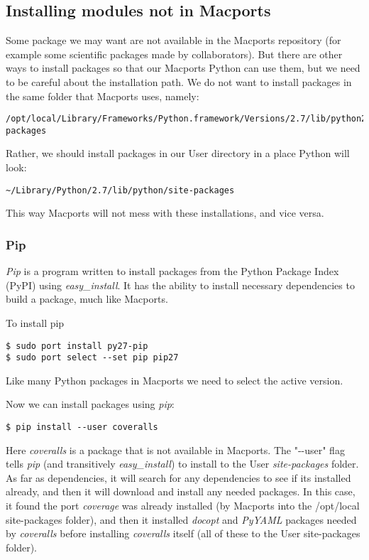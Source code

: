 \documentclass[11pt, A4paper]{article}
\begin{document}
\subsection{Installing modules not in Macports}
Some package we may want are not available in the Macports repository (for example some scientific packages made by collaborators). But there are other ways to install packages so that our Macports Python can use them, but we need to be careful about the installation path. We do not want to install packages in the same folder that Macports uses, namely:
\begin{lstlisting}[style=Bash]
/opt/local/Library/Frameworks/Python.framework/Versions/2.7/lib/python2.7/site-packages
\end{lstlisting}
Rather, we should install packages in our User directory in a place Python will look:
\begin{lstlisting}[style=Bash]
~/Library/Python/2.7/lib/python/site-packages
\end{lstlisting}
This way Macports will not mess with these installations, and vice versa. 



\subsubsection{Pip}
{\it Pip} is a program written to install packages from the Python Package Index (PyPI) using {\it easy\_install}. It has the ability to install necessary dependencies to build a package, much like Macports. 

To install pip
\begin{lstlisting}[style=Bash]
$ sudo port install py27-pip
$ sudo port select --set pip pip27
\end{lstlisting}
Like many Python packages in Macports we need to select the active version.

Now we can install packages using {\it pip}:
\begin{lstlisting}[style=Bash]
$ pip install --user coveralls
\end{lstlisting}
Here {\it coveralls} is a package that is not available in Macports. The "-{}-user" flag tells {\it pip} (and transitively {\it easy\_install}) to install to the User {\it site-packages} folder. As far as dependencies, it will search for any dependencies to see if its installed already, and then it will download and install any needed packages. In this case, it found the port {\it coverage} was already installed (by Macports into the /opt/local site-packages folder), and then it installed {\it docopt} and {\it PyYAML} packages needed by {\it coveralls} before installing {\it coveralls} itself (all of these to the User site-packages folder).
\end{document}

